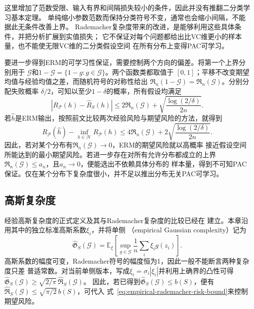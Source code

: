 这里增加了范数受限、输入有界和间隔损失较小的条件，因此并没有推翻二分类学习基本定理。
单纯缩小参数范数而保持分类符号不变，通常也会缩小间隔，不能据此无条件改善上界。
Rademacher复杂度带来的改进，是能够利用这些具体条件，并把分析扩展到实值损失；
它不保证对每个问题都给出比VC维更小的样本量，也不能使无限VC维的二分类假设空间
在所有分布上变得PAC可学习。


要进一步得到ERM的可学习性保证，需要控制两个方向的偏差。将第一个上界分别用于
$\mathcal G$和$1-\mathcal G=\{1-g:g\in\mathcal G\}$。两个函数类都取值于
$[0,1]$；平移不改变期望均值与经验均值之差，而随机符号的对称性给出
$\mathfrak R_n(1-\mathcal G)=\mathfrak R_n(\mathcal G)$。分别分配失败概率
$\delta/2$，可知以至少$1-\delta$的概率，所有假设均满足
\[
 |R_{\mathcal P}(h)-\hat R_S(h)|
 \leq2\mathfrak R_n(\mathcal G)+\sqrt{\frac{\log(2/\delta)}{2n}}.
\]
若$\hat h$是ERM输出，按照前文比较两次经验风险与期望风险的方法，就得到
\begin{equation}
 R_{\mathcal P}(\hat h)-\inf_{h\in\mathcal H}R_{\mathcal P}(h)
 \leq4\mathfrak R_n(\mathcal G)
 +2\sqrt{\frac{\log(2/\delta)}{2n}}.
 \label{eq:rademacher-excess-risk}
\end{equation}
因此，若对某个分布有$\mathfrak R_n(\mathcal G)\to0$，ERM的期望风险就以高概率
接近假设空间所能达到的最小期望风险。若进一步存在对所有允许分布都成立的上界
$\mathfrak R_n(\mathcal G)\leq a_n$，且$a_n\to0$，便能选出不依赖具体分布的
样本量，得到不可知PAC保证。仅在某个分布下复杂度很小，并不足以推出分布无关PAC可学习。

\subsection{高斯复杂度}

经验高斯复杂度的正式定义及其与Rademacher复杂度的比较已经在
建立。本章沿用其中的独立标准高斯系数$\xi_i$，并将单侧
（empirical Gaussian complexity）记为
\[
 \widehat{\mathfrak G}_S(\mathcal G)
 =\mathbb E_\xi\left[\sup_{g\in\mathcal G}\frac1n\sum_i \xi_i g(z_i)\right].
\]
高斯系数的幅度可变，Rademacher符号的幅度恒为1，因此一般不能断言两种复杂度只差
普适常数。对当前单侧版本，写成$\xi_i=\sigma_i|\xi_i|$并利用上确界的凸性可得
$\widehat{\mathfrak G}_S(\mathcal G)\geq\sqrt{2/\pi}\,\widehat{\mathfrak R}_S(\mathcal G)$。
因此，若已得到$\widehat{\mathfrak G}_S(\mathcal G)\leq b(S)$，便有
$\widehat{\mathfrak R}_S(\mathcal G)\leq\sqrt{\pi/2}\,b(S)$，可代入
式~\eqref{eq:empirical-rademacher-risk-bound}来控制期望风险。

